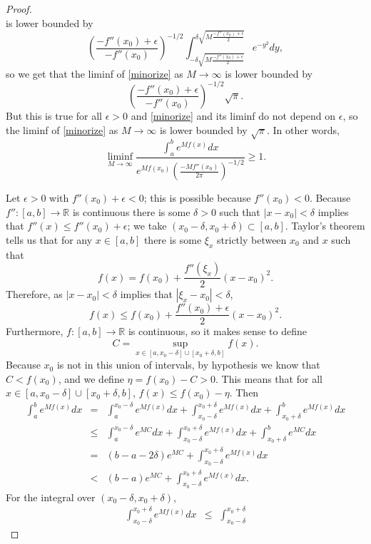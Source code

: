 \documentclass{article}
\theoremstyle{definition}
\begin{document}
\begin{proof}
\begin{equation}
\label{minorize}
\end{equation}
is lower bounded by
\[
\left( \frac{-f''(x_0)+\epsilon}{-f''(x_0)}\right)^{-1/2} \int_{-\delta \sqrt{M\frac{-f''(x_0)+\epsilon}{2}}}^{\delta \sqrt{M\frac{-f''(x_0)+\epsilon}{2}}}
e^{-y^2} dy,
\]
so we get that the liminf of \eqref{minorize} as $M \to \infty$ is lower bounded by
\[
\left( \frac{-f''(x_0)+\epsilon}{-f''(x_0)}\right)^{-1/2} \sqrt{\pi}.
\]
But this is true for all $\epsilon>0$ and \eqref{minorize} and its liminf do not depend on $\epsilon$, so the liminf
of \eqref{minorize} as $M \to \infty$ is lower bounded by $\sqrt{\pi}$. In other words,
\[
\liminf_{M \to \infty} \frac{\int_a^b e^{Mf(x)} dx}{e^{Mf(x_0)} \left(\frac{-Mf''(x_0)}{2 \pi}\right)^{-1/2}} \geq 1.
\]

Let $\epsilon>0$ with $f''(x_0)+\epsilon<0$; this is possible because $f''(x_0)<0$. Because $f'':[a,b] \to \mathbb{R}$ is continuous
there is some $\delta>0$ such that $|x-x_0|<\delta$ implies that $f''(x) \leq f''(x_0)+\epsilon$;
we take $(x_0-\delta,x_0+\delta) \subset [a,b]$. Taylor's theorem tells us that for any $x \in [a,b]$ there is some $\xi_x$ strictly between $x_0$ and $x$ such that
\[
f(x)=f(x_0)+\frac{f''(\xi_x)}{2}(x-x_0)^2.
\]
Therefore, as  $|x-x_0|<\delta$ implies that $|\xi_x-x_0|<\delta$,
\begin{equation}
f(x) \leq f(x_0) + \frac{f''(x_0)+\epsilon}{2}(x-x_0)^2.
\label{fupper}
\end{equation}
Furthermore, $f:[a,b] \to \mathbb{R}$ is continuous, 
so it makes sense to define
\[
C = \sup_{x \in [a,x_0-\delta] \cup [x_0+\delta,b]} f(x).
\]
Because $x_0$ is not
in this union of intervals, by hypothesis we know
that $C<f(x_0)$, and we define $\eta=f(x_0)-C>0$. This means that for all $x \in [a,x_0-\delta] \cup [x_0+\delta,b]$, $f(x) \leq f(x_0)-\eta$. 
Then
\begin{eqnarray*}
\int_a^b e^{Mf(x)} dx&=&\int_a^{x_0-\delta} e^{Mf(x)} dx + \int_{x_0-\delta}^{x_0+\delta}
e^{Mf(x)} dx + \int_{x_0+\delta}^b e^{Mf(x)} dx\\
&\leq&\int_a^{x_0-\delta} e^{MC} dx  + \int_{x_0-\delta}^{x_0+\delta}
e^{Mf(x)} dx + \int_{x_0+\delta}^b e^{MC} dx\\
&=&(b-a-2\delta) e^{MC} + \int_{x_0-\delta}^{x_0+\delta}
e^{Mf(x)} dx\\
&<&(b-a) e^{MC} + \int_{x_0-\delta}^{x_0+\delta}
e^{Mf(x)} dx.
\end{eqnarray*}
For the integral over $(x_0-\delta,x_0+\delta)$,
\begin{eqnarray*}
\int_{x_0-\delta}^{x_0+\delta} e^{Mf(x)} dx&\leq&\int_{x_0-\delta}^{x_0+\delta}

\end{eqnarray*}
\end{proof}
\end{document}
